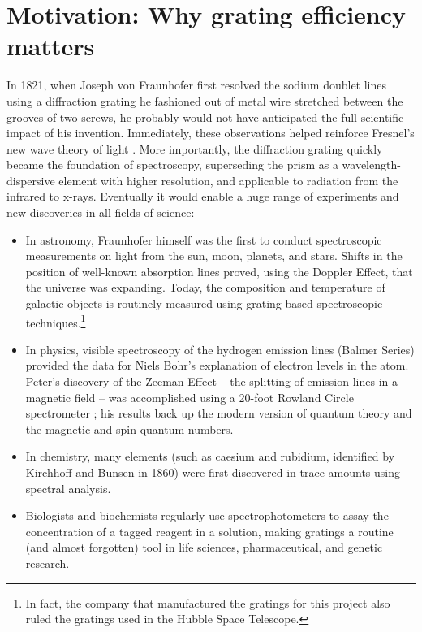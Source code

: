 \chapter{Motivation: Why grating efficiency matters}
In 1821, when Joseph von Fraunhofer first resolved the sodium doublet lines using a diffraction grating he fashioned out of metal wire stretched between the grooves of two screws, he probably would not have anticipated the full scientific impact of his invention.
Immediately, these observations helped reinforce Fresnel's new wave theory of light \cite{Fra23}. %
More importantly, the diffraction grating quickly became the foundation of spectroscopy, superseding the prism as a wavelength-dispersive element with higher resolution, and applicable to radiation from the infrared to x-rays.  Eventually it would enable a huge range of experiments and new discoveries in all fields of science:
\begin{itemize}
\item In astronomy, Fraunhofer himself was the first to conduct spectroscopic measurements on light from the sun, moon, planets, and stars.  Shifts in the position of well-known absorption lines proved, using the Doppler Effect, that the universe was expanding.  Today, the composition and temperature of galactic objects is routinely measured using grating-based spectroscopic techniques.\footnote{In fact, the company that manufactured the gratings for this project also ruled the gratings used in the Hubble Space Telescope.}
\item In physics, visible spectroscopy of the hydrogen emission lines (Balmer Series) provided the data for Niels Bohr's explanation of electron levels in the atom.  Peter's discovery of the Zeeman Effect -- the splitting of emission lines in a magnetic field -- was accomplished using a 20-foot Rowland Circle spectrometer \cite{Zee97}; his results back up the modern version of quantum theory and the magnetic and spin quantum numbers.
\item In chemistry, many elements (such as caesium and rubidium, identified by Kirchhoff and Bunsen in 1860) were first discovered in trace amounts using spectral analysis.
\item Biologists and biochemists regularly use spectrophotometers to assay the concentration of a tagged reagent in a solution, making gratings a routine (and almost forgotten) tool in life sciences, pharmaceutical, and genetic research.
\end{itemize}

